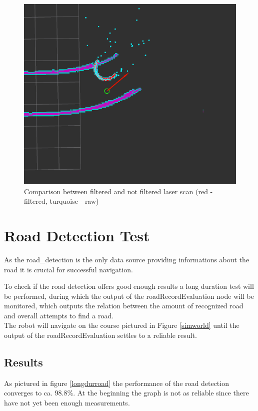 \begin{figure}[H]
	\includegraphics[width=\textwidth]{Pictures/LASERFILTER COMP}	
	\caption{Comparison between filtered and not filtered laser scan (red - filtered, turquoise - raw)}
	\label{lasercomp}
\end{figure}

\section{Road Detection Test}

As the road\_detection is the only data source providing informations about the road it is crucial for successful navigation.

To check if the road detection offers good enough results a long duration test will be performed, during which the output of the roadRecordEvaluation node will be monitored, which outputs the relation between the amount of recognized road and overall attempts to find a road.\\

The robot will navigate on the course pictured in Figure \ref{simworld} until the output of the roadRecordEvaluation settles to a reliable result.

\subsection{Results}
As pictured in figure \ref{longdurroad} the performance of the road detection converges to ca. 98.8\%. At the beginning the graph is not as reliable since there have not yet been enough measurements.\\

